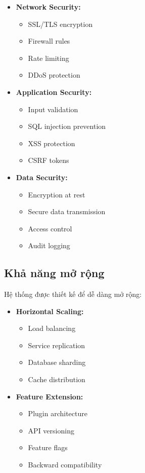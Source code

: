 \begin{itemize}
    \item \textbf{Network Security:}
    \begin{itemize}
        \item SSL/TLS encryption
        \item Firewall rules
        \item Rate limiting
        \item DDoS protection
    \end{itemize}
    
    \item \textbf{Application Security:}
    \begin{itemize}
        \item Input validation
        \item SQL injection prevention
        \item XSS protection
        \item CSRF tokens
    \end{itemize}
    
    \item \textbf{Data Security:}
    \begin{itemize}
        \item Encryption at rest
        \item Secure data transmission
        \item Access control
        \item Audit logging
    \end{itemize}
\end{itemize}

\subsection{Khả năng mở rộng}
\hspace{0.5cm}Hệ thống được thiết kế để dễ dàng mở rộng:

\begin{itemize}
    \item \textbf{Horizontal Scaling:}
    \begin{itemize}
        \item Load balancing
        \item Service replication
        \item Database sharding
        \item Cache distribution
    \end{itemize}
    
    \item \textbf{Feature Extension:}
    \begin{itemize}
        \item Plugin architecture
        \item API versioning
        \item Feature flags
        \item Backward compatibility
    \end{itemize}
\end{itemize} 